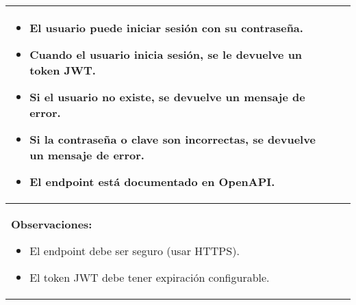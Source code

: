 \begin{table}[H]
\begin{center}
\begin{tabularx}{\textwidth}{|l|X|l|}
{                    \begin{itemize}
                        \item El usuario puede iniciar sesión con su contraseña.
                        \item Cuando el usuario inicia sesión, se le devuelve un token JWT.
                        \item Si el usuario no existe, se devuelve un mensaje de error.
                        \item Si la contraseña o clave son incorrectas, se devuelve un mensaje de error.
                        \item El endpoint está documentado en OpenAPI.
                    \end{itemize}
            }\\
            \hline
            \multicolumn{3}{|p{\textwidth}|}{
                \textbf{Observaciones:}
                \begin{itemize}
                    \item El endpoint debe ser seguro (usar HTTPS).
                    \item El token JWT debe tener expiración configurable.
                \end{itemize}
            }\\
            \hline
        \end{tabularx}
    \end{center}
\end{table}

